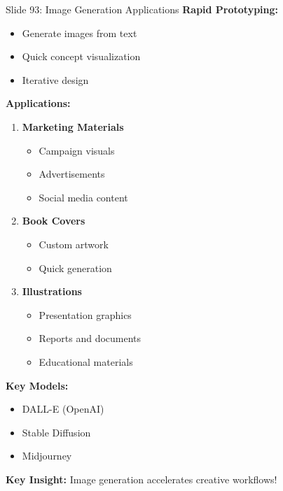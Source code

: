 \documentclass[8pt]{beamer}
\begin{document}
	\begin{frame}{Slide 93: Image Generation Applications}
		\fontsize{6.5}{7.5}\selectfont
		\textbf{Rapid Prototyping:}
		\begin{itemize}
			\item Generate images from text
			\item Quick concept visualization
			\item Iterative design
		\end{itemize}
		
		\vspace{0.1cm}
		\textbf{Applications:}
		\begin{enumerate}
			\item \textbf{Marketing Materials}
			\begin{itemize}
				\item Campaign visuals
				\item Advertisements
				\item Social media content
			\end{itemize}
			\item \textbf{Book Covers}
			\begin{itemize}
				\item Custom artwork
				\item Quick generation
			\end{itemize}
			\item \textbf{Illustrations}
			\begin{itemize}
				\item Presentation graphics
				\item Reports and documents
				\item Educational materials
			\end{itemize}
		\end{enumerate}
		
		\vspace{0.1cm}
		\textbf{Key Models:}
		\begin{itemize}
			\item DALL-E (OpenAI)
			\item Stable Diffusion
			\item Midjourney
		\end{itemize}
		
		\textcolor{myblue}{\textbf{Key Insight:}} Image generation accelerates creative workflows!
	\end{frame}
	
\end{document}
